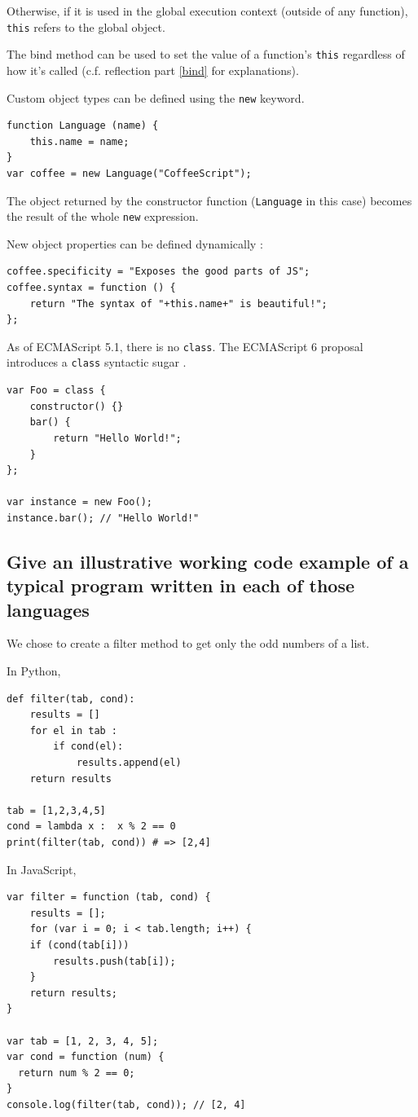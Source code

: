 \documentclass[a4paper,10pt]{article}
\begin{document}
Otherwise, if it is used in the global execution context (outside of any function), \lstinline|this| refers to the global object.

The bind method can be used to set the value of a function's \lstinline|this| regardless of how it's called (c.f. reflection part \ref{bind} for explanations).

Custom object types can be defined using the \lstinline|new| keyword.
\begin{lstlisting}
function Language (name) {
    this.name = name;
}
var coffee = new Language("CoffeeScript");
\end{lstlisting}
The object returned by the constructor function (\lstinline|Language| in this case) becomes the result of the whole \lstinline|new| expression.

New object properties can be defined dynamically :
\begin{lstlisting}
coffee.specificity = "Exposes the good parts of JS";
coffee.syntax = function () {
    return "The syntax of "+this.name+" is beautiful!";
};
\end{lstlisting}


As of ECMAScript 5.1, there is no \lstinline|class|.
The ECMAScript 6 proposal introduces a \lstinline|class| syntactic sugar \cite{js:class}.

\begin{lstlisting}
var Foo = class {
	constructor() {}
	bar() {
		return "Hello World!";
	}
};

var instance = new Foo();
instance.bar(); // "Hello World!"
\end{lstlisting}


\subsection{Give an illustrative working code example of a typical program written in each of those languages}
We chose to create a filter method to get only the odd numbers of a list.

In Python,
\setpy
\begin{lstlisting}
def filter(tab, cond):
    results = []
    for el in tab :
        if cond(el):
            results.append(el)
    return results

tab = [1,2,3,4,5]
cond = lambda x :  x % 2 == 0
print(filter(tab, cond)) # => [2,4]
\end{lstlisting}

In JavaScript,
\setjs
\begin{lstlisting}
var filter = function (tab, cond) {
	results = [];
	for (var i = 0; i < tab.length; i++) {
	if (cond(tab[i]))
		results.push(tab[i]);
	}
	return results;
}

var tab = [1, 2, 3, 4, 5];
var cond = function (num) {
  return num % 2 == 0;
}
console.log(filter(tab, cond)); // [2, 4]
\end{lstlisting}
\end{document}
